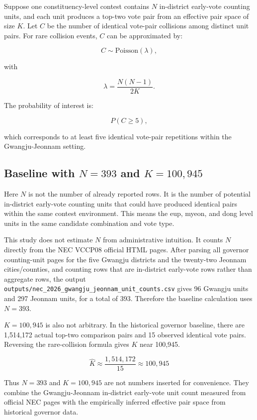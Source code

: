 \documentclass[preprint]{IEIE}
\begin{document}
Suppose one constituency-level contest contains \(N\) in-district early-vote counting units, and each unit produces a top-two vote pair from an effective pair space of size \(K\). Let \(C\) be the number of identical vote-pair collisions among distinct unit pairs. For rare collision events, \(C\) can be approximated by:

\[
C \sim \mathrm{Poisson}(\lambda),
\]

with

\[
\lambda = \frac{N(N-1)}{2K}.
\]

The probability of interest is:

\[
P(C \geq 5),
\]

which corresponds to at least five identical vote-pair repetitions within the Gwangju-Jeonnam setting.

\subsection{Baseline with \(N=393\) and \(K=100,945\)}

Here \(N\) is not the number of already reported rows. It is the number of potential in-district early-vote counting units that could have produced identical pairs within the same contest environment. This means the eup, myeon, and dong level units in the same candidate combination and vote type.

This study does not estimate \(N\) from administrative intuition. It counts \(N\) directly from the NEC VCCP08 official HTML pages. After parsing all governor counting-unit pages for the five Gwangju districts and the twenty-two Jeonnam cities/counties, and counting rows that are in-district early-vote rows rather than aggregate rows, the output \texttt{outputs/nec\_2026\_gwangju\_jeonnam\_unit\_counts.csv} gives 96 Gwangju units and 297 Jeonnam units, for a total of 393. Therefore the baseline calculation uses \(N=393\).

\(K=100,945\) is also not arbitrary. In the historical governor baseline, there are 1,514,172 actual top-two comparison pairs and 15 observed identical vote pairs. Reversing the rare-collision formula gives \(K\) near 100,945.

\[
\hat{K} \approx \frac{1,514,172}{15} \approx 100,945
\]

Thus \(N=393\) and \(K=100,945\) are not numbers inserted for convenience. They combine the Gwangju-Jeonnam in-district early-vote unit count measured from official NEC pages with the empirically inferred effective pair space from historical governor data.
\end{document}
